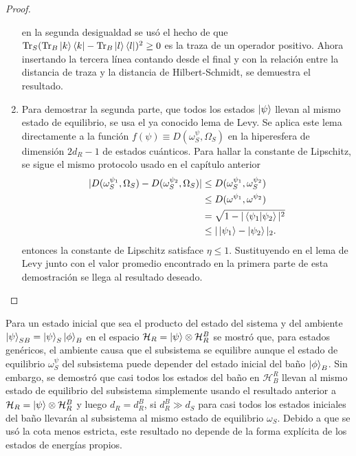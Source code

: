 \begin{proof}
\begin{enumerate}
en la segunda desigualdad se usó el hecho de que $\Tr_{S} (\Tr_{B} \ket{k}\bra{k}-\Tr_{B} \ket{l}\bra{l})^{2}\geq 0$ es la traza de un operador positivo. Ahora insertando la tercera línea contando desde el final y con la relación entre la distancia de traza y la distancia de Hilbert-Schmidt, se demuestra el resultado.
\item Para demostrar la segunda parte, que todos los estados $\ket{\psi}$ llevan al mismo estado de equilibrio, se usa el ya conocido lema de Levy. Se aplica este lema directamente a la función $f(\psi) \equiv D(\omega_{S}^{\psi}, \Omega_{S})$ en la hiperesfera de dimensión $2d_{R}-1$ de estados cuánticos. Para hallar la constante de Lipschitz, se sigue el mismo protocolo usado en el capítulo anterior
\begin{align*}
|D(\omega_{S}^{\psi_{1}}, \Omega_{S})-D(\omega_{S}^{\psi_{2}},\Omega_{S})| &\leq D(\omega_{S}^{\psi_{1}},\omega_{S}^{\psi_{2}})
\\
&\leq D(\omega^{\psi_{1}},\omega^{\psi_{2}})
\\
&= \sqrt{1- |\bra{\psi_{1}} \ket{\psi_{2}}|^{2}}
\\
&\leq |\ket{\psi_{1}} - \ket{\psi_{2}}|_{2}.
\end{align*} 
entonces la constante de Lipschitz satisface $\eta \leq 1$. Sustituyendo en el lema de Levy junto con el valor promedio encontrado en la primera parte de esta demostración se llega al resultado deseado.
\\
\end{enumerate}
\end{proof}
Para un estado inicial que sea el producto del estado del sistema y del ambiente $\ket{\psi}_{SB}= \ket{\psi}_{S} \ket{\phi}_{B}$ en el espacio $\mathcal{H}_{R}=\ket{\psi} \otimes \mathcal{H}_{R}^{B}$ se mostró que, para estados genéricos, el ambiente causa que el subsistema se equilibre aunque el estado de equilibrio $\omega_{S}^{\psi}$ del subsistema puede depender del estado inicial del baño $\ket{\phi}_{B}$. Sin embargo, se demostró que casi todos los estados del baño en $\mathcal{H}_{B}^{R}$ llevan al mismo estado de equilibrio del subsistema simplemente usando el resultado anterior a $\mathcal{H}_{R} = \ket{\psi}\otimes \mathcal{H}_{R}^{B}$ y luego $d_{R} = d_{R}^{B}$, si $d_{R}^{B} \gg d_{S}$ para casi todos los estados iniciales del baño llevarán al subsistema al mismo estado de equilibrio $\omega_{S}$. Debido a que se usó la cota menos estricta, este resultado no depende de la forma explícita de los estados de energías propios.
\\



